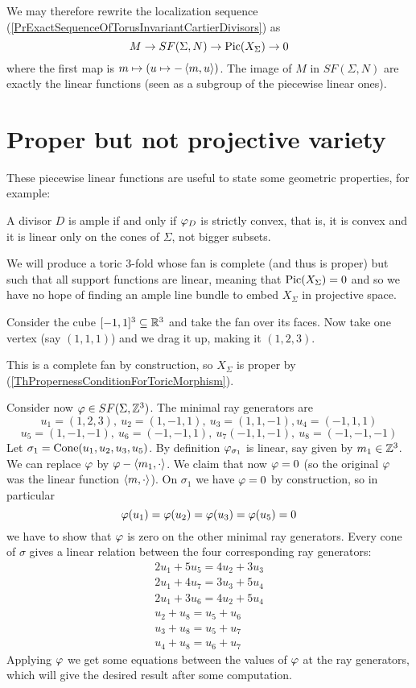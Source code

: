 We may therefore rewrite the localization sequence (\ref{PrExactSequenceOfTorusInvariantCartierDivisors}) as
\[M\to SF(\Sigma,N)\to \operatorname{Pic}(X_\Sigma)\to 0\]
where the first map is $m\mapsto (u\mapsto -\left\langle {m,u}\right\rangle)$. The image of $M$ in $SF(\Sigma,N)$ are exactly the linear functions (seen as a subgroup of the piecewise linear ones).

\section{Proper but not projective variety}

These piecewise linear functions are useful to state some geometric properties, for example:

\begin{fact}[]
A divisor $D$ is ample if and only if $\varphi_D$ is strictly convex, that is, it is convex and it is linear only on the cones of $\Sigma$, not bigger subsets.
\end{fact}

We will produce a toric 3-fold whose fan is complete (and thus is proper) but such that all support functions are linear, meaning that $\operatorname{Pic}(X_\Sigma)=0$ and so we have no hope of finding an ample line bundle to embed $X_\Sigma$ in projective space.



Consider the cube $[-1,1]^3\subseteq \mathbb{R}^3$ and take the fan over its faces. Now take one vertex (say $(1,1,1)$) and we drag it up, making it $(1,2,3)$.

This is a complete fan by construction, so $X_\Sigma$ is proper by (\ref{ThPropernessConditionForToricMorphism}).

Consider now $\varphi\in SF(\Sigma,\mathbb{Z}^3)$. The minimal ray generators are
\[u_1=(1,2,3),\ u_2=(1,-1,1),\ u_3=(1,1,-1),u_4=(-1,1,1)\]
\[u_5=(1,-1,-1),\ u_6=(-1,-1,1),\ u_7(-1,1,-1),\ u_8=(-1,-1,-1)\]
Let $\sigma_1=\operatorname{Cone}(u_1,u_2,u_3,u_5)$. By definition $\varphi_{\sigma_1}$ is linear, say given by $m_1\in \mathbb{Z}^3$. We can replace $\varphi$ by $\varphi-\left\langle {m_1,\cdot}\right\rangle$. We claim that now $\varphi=0$ (so the original $\varphi$ was the linear function $\left\langle {m,\cdot}\right\rangle$). On $\sigma_1$ we have $\varphi=0$ by construction, so in particular
\[\varphi(u_1)=\varphi(u_2)=\varphi(u_3)=\varphi(u_5)=0\]
we have to show that $\varphi$ is zero on the other minimal ray generators. Every cone of $\sigma$ gives a linear relation between the four corresponding ray generators:
\begin{gather*}
2u_1+5u_5=4u_2+3u_3\\
2u_1+4u_7=3u_3+5u_4\\
2u_1+3u_6=4u_2+5u_4\\
u_2+u_8=u_5+u_6\\
u_3+u_8=u_5+u_7\\
u_4+u_8=u_6+u_7
\end{gather*} 
Applying $\varphi$ we get some equations between the values of $\varphi$ at the ray generators, which will give the desired result after some computation.


